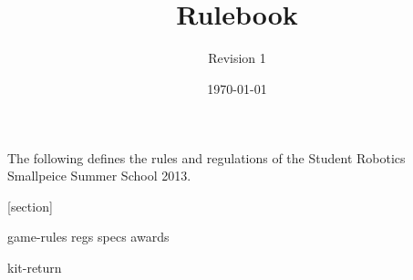 \documentclass[a4paper, 11pt]{scrartcl}
\title {\compname \\ Rulebook}
\author{Revision 1}
\date{\today}
\newcommand{\compname}{Student Robotics Smallpeice Summer School 2013}
\begin{document}
\maketitle

\noindent The following defines the rules and regulations of the \compname.

[section]
\newcommand{\rcn}{\stepcounter{rule}\arabic{section}.\arabic{rule}}
\renewcommand{\labelenumi}{\rcn}

 {game-rules}
\newpage
 {regs}
\newpage
 {specs}
\newpage
 {awards}

\renewcommand{\labelenumi}{\rcn}


\newpage
\appendix
\appendixpage
\addappheadtotoc
 {kit-return}
\end{document}
